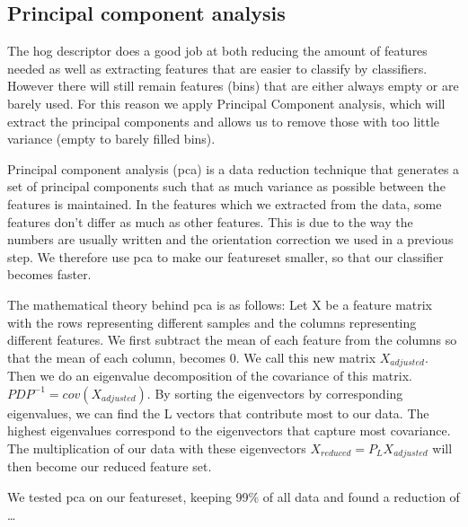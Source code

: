 \documentclass[%
        compressed,
        final,
        notitlepage,
        narroweqnarray,
        inline,
        twoside,
        ]{ieee}
\begin{document}

\subsection{Principal component analysis}
The hog descriptor does a good job at both reducing the amount of features needed as well as extracting features that are easier to classify by classifiers. However there will still remain features (bins) that are either always empty or are barely used. For this reason we apply Principal Component analysis, which will extract the principal components and allows us to remove those with too little variance (empty to barely filled bins).

Principal component analysis (pca) is a data reduction technique that generates a set of
principal components such that as much variance as possible between the features is maintained.  In the features which we extracted from the data, some features don't differ as much as other features. This is due to the way the numbers are usually written and the orientation correction we used in a previous step. We therefore use pca to make our featureset smaller, so that our classifier becomes faster.

The mathematical theory behind pca is as follows:
Let X be a feature matrix with the rows representing different samples and the
columns representing different features.  We first subtract the mean of each
feature from the columns so that the mean of each column, becomes 0. We call
this new matrix $X_{adjusted}$. Then we do an eigenvalue decomposition of the
covariance of this matrix. $PDP^{-1}=cov(X_{adjusted})$. By sorting the
eigenvectors by corresponding eigenvalues, we can find the L vectors that
contribute most to our data.  The highest eigenvalues correspond to the
eigenvectors that capture most covariance. The multiplication of our data with
these eigenvectors $X_{reduced}=P_L X_{adjusted}$ will then become our reduced feature set.

We tested pca on our featureset, keeping 99\% of all data and found a reduction of …%

\end{document}
